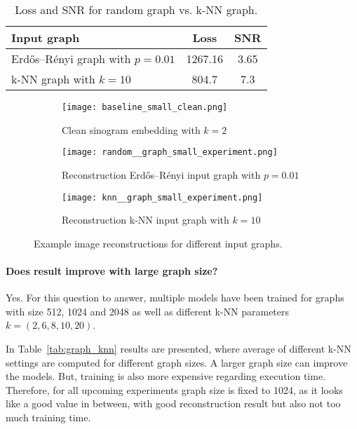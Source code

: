   \begin{table}[H]
    \centering
      \begin{tabular}{l|cc}
      \toprule
      \textbf{Input graph} & \textbf{Loss} & \textbf{SNR}  \\ 
      \midrule
      Erdős–Rényi graph with $p=0.01$    &  1267.16         &  3.65   \\ \hline
      k-NN graph with $k=10$             &  804.7           &  7.3    \\ \hline
      \midrule
      \end{tabular}
    \caption{Loss and SNR for random graph vs. k-NN graph. }
    \label{tab:input_graph}
  \end{table}

\begin{figure}[H]
  \captionsetup[subfigure]{justification=centering}
  \centering
  \begin{subfigure}[t]{0.3\textwidth}
      \texttt{[image: baseline\_small\_clean.png]}
      \caption{Clean sinogram embedding with $k=2$}
      \label{fig:small_experiment_clean2}
  \end{subfigure}\hfill
  \begin{subfigure}[t]{0.3\textwidth}
    \texttt{[image: random\_\_graph\_small\_experiment.png]}
    \caption{Reconstruction Erdős–Rényi input graph with $p=0.01$}
    \label{fig:small_experiment_random_graph}
  \end{subfigure}\hfill
  \begin{subfigure}[t]{0.3\textwidth}
    \texttt{[image: knn\_\_graph\_small\_experiment.png]}
    \caption{Reconstruction k-NN input graph with $k=10$}
    \label{fig:small_experiment_knn_graph}
  \end{subfigure}
  \caption{Example image reconstructions for different input graphs.}
  \label{fig:input_graph_small}
\end{figure}



  \paragraph{Does result improve with large graph size?}
  Yes.
  For this question to answer, multiple models have been trained for graphs with size 512, 1024 and 2048 
  as well as different k-NN parameters $k = (2,6,8,10,20)$.

  In Table~\ref{tab:graph_knn} results are presented, where average of different k-NN settings
  are computed for different graph sizes.
  A larger graph size can improve the models. 
  But, training is also more expensive regarding execution time. 
  Therefore, for all upcoming experiments graph size is fixed to 1024, as it looks like a good
  value in between, with good reconstruction result but also not too much training time.
  
